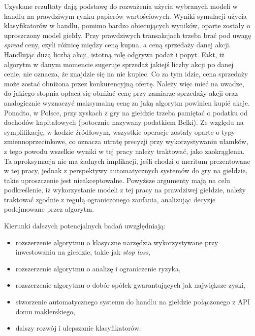 \documentclass[a4paper, twoside, 11pt, openright]{article}
\begin{document}
 Uzyskane rezultaty dają podstawę do rozważenia użycia wybranych modeli w handlu na prawdziwym rynku papierów wartościowych. Wyniki symulacji użycia klasyfikatorów w handlu, pomimo bardzo obiecujących wyników, oparte zostały o uproszczony model giełdy. Przy prawdziwych transakcjach trzeba brać pod uwagę \textit{spread} ceny, czyli różnicę między ceną kupna, a ceną sprzedaży danej akcji. Handlując dużą liczbą akcji, istotną rolę odgrywa podaż i popyt. Fakt, iż algorytm w danym momencie sugeruje sprzedaż jakiejś liczby akcji po danej cenie, nie oznacza, że znajdzie się na nie kupiec. Co za tym idzie, cena sprzedaży może zostać obniżona przez konkurencyjną ofertę. Należy więc mieć na uwadze, do jakiego stopnia opłaca się obniżać cenę przy zamiarze sprzedaży akcji oraz analogicznie wyznaczyć maksymalną cenę za jaką algorytm powinien kupić akcje. Ponadto, w Polsce, przy zyskach z gry na giełdzie trzeba pamiętać o podatku od dochodów kapitałowych (potocznie nazywany podatkiem Belki). Ze względu na symplifikację, w kodzie źródłowym, wszystkie operacje zostały oparte o typy zmiennoprzecinkowe, co oznacza utratę precyzji przy wykorzystywaniu ułamków, z tego powodu wszelkie wyniki w tej pracy należy traktować, jako zaokrąglenia. Ta aproksymacja nie ma żadnych implikacji, jeśli chodzi o meritum prezentowane w tej pracy, jednak z perspektywy automatycznych systemów do gry na giełdzie, takie uproszczenie jest nieakceptowalne. Powyższe argumenty mają na celu podkreślenie, iż wykorzystanie modeli z tej pracy na prawdziwej giełdzie, należy traktować zgodnie z regułą ograniczonego zaufania, analizując decyzje podejmowane przez algorytm.

\bigskip

Kierunki dalszych potencjalnych badań uwzględniają:
\begin{itemize}
	\item rozszerzenie algorytmu o klasyczne narzędzia wykorzystywane przy inwestowaniu na giełdzie, takie jak \textit{stop loss},
	\item rozszerzenie algorytmu o analizę i ograniczenie ryzyka,
	\item rozszerzenie algorytmu o dobór spółek gwarantujących jak największe zyski,
	\item stworzenie automatycznego systemu do handlu na giełdzie połączonego z API domu maklerskiego,
	\item dalszy rozwój i ulepszanie klasyfikatorów.
\end{itemize}

\newpage
\end{document}
